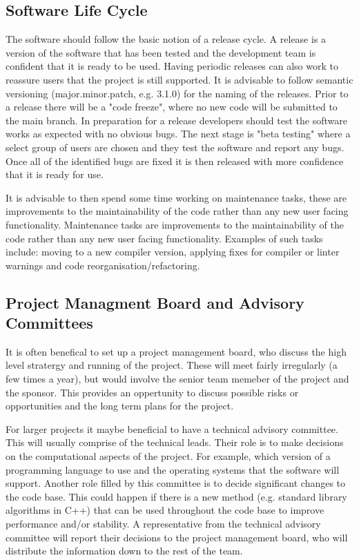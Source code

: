 \documentclass[jnr]{iosart2x}
\begin{document}
\subsection{Software Life Cycle}\label{lc}
The software should follow the basic notion of a release cycle.
A release is a version of the software that has been tested and the development team is confident that it is ready to be used.
Having periodic releases can also work to reassure users that the project is still supported.
It is advisable to follow semantic versioning \cite{Semantic_Versioning} (major.minor.patch, e.g. 3.1.0) for the naming of the releases.
Prior to a release there will be a "code freeze", where no new code will be submitted to the main branch.
In preparation for a release developers should test the software works as expected with no obvious bugs.
The next stage is "beta testing" where a select group of users are chosen and they test the software and report any bugs.
Once all of the identified bugs are fixed it is then released with more confidence that it is ready for use.

It is advisable to then spend some time working on maintenance tasks, these are improvements to the maintainability of the code rather than any new user facing functionality.
Maintenance tasks are improvements to the maintainability of the code rather than any new user facing functionality.
Examples of such tasks include: moving to a new compiler version, applying fixes for compiler or linter warnings and code reorganisation/refactoring.

\subsection{Project Managment Board and Advisory Committees}\label{PM big}

It is often benefical to set up a project management board, who discuss the high level stratergy and running of the project.
These will meet fairly irregularly (a few times a year), but would involve the senior team memeber of the project and the sponsor.
This provides an oppertunity to discuss possible risks or opportunities and the long term plans for the project.

For larger projects it maybe beneficial to have a technical advisory committee.
This will usually comprise of the technical leads.
Their role is to make decisions on the computational aspects of the project.
For example, which version of a programming language to use and the operating systems that the software will support.
Another role filled by this committee is to decide significant changes to the code base.
This could happen if there is a new method (e.g. standard library algorithms in C++) that can be used throughout the code base to improve performance and/or stability.
A representative from the technical advisory committee will report their decisions to the project management board, who will distribute the information down to the rest of the team.
\end{document}
